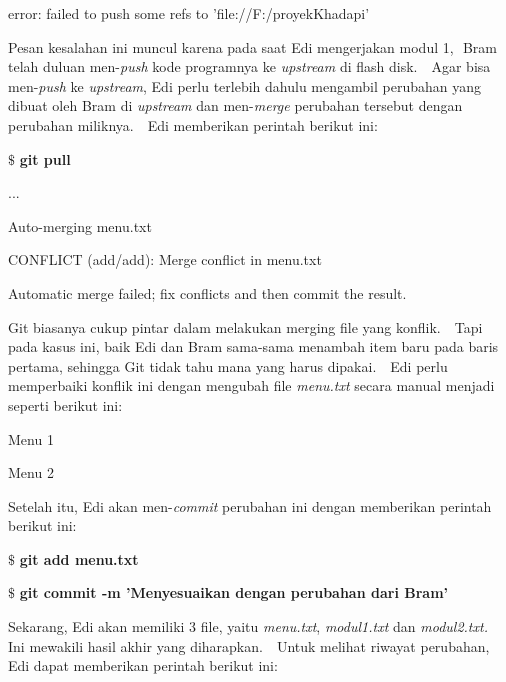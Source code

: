 \noindent 
error: failed to push some refs to 'file://F:/proyekKhadapi' \par
\noindent 
\vspace{12pt}
\noindent 
Pesan kesalahan ini muncul karena pada saat Edi mengerjakan modul 1, $  $ Bram telah duluan men-\textit{push} kode programnya ke \textit{upstream }di flash disk. $  $ $  $ Agar bisa men-\textit{push} ke \textit{upstream}, Edi perlu terlebih dahulu mengambil perubahan yang dibuat oleh Bram di \textit{upstream} dan men-\textit{merge} perubahan tersebut dengan perubahan miliknya. $  $ $  $ Edi memberikan perintah berikut ini: \par
\vspace{12pt}
\noindent 
 $  \$  $ \textbf{git pull} \par
\noindent 
... \par
\noindent 
Auto-merging menu.txt \par
\noindent 
CONFLICT (add/add): Merge conflict in menu.txt \par
\noindent 
Automatic merge failed; fix conflicts and then commit the result. \par
\noindent 
\vspace{12pt}
\noindent 
\vspace{12pt}
\noindent 
Git biasanya cukup pintar dalam melakukan merging file yang konflik. $  $ $  $ Tapi pada kasus ini, baik Edi dan Bram sama-sama menambah item baru pada baris pertama, sehingga Git tidak tahu mana yang harus dipakai. $  $ $  $ Edi perlu memperbaiki konflik ini dengan mengubah file \textit{menu.txt} secara manual menjadi seperti berikut ini: \par
\vspace{12pt}
\vspace{12pt}
\noindent 
Menu 1 \par
\noindent 
Menu 2 \par
\noindent 
\vspace{12pt}
\noindent 
\vspace{12pt}
\noindent 
Setelah itu, Edi akan men-\textit{commit} perubahan ini dengan memberikan perintah berikut ini: \par
\vspace{12pt}
\noindent 
 $  \$  $ \textbf{git add menu.txt} \par
\noindent 
 $  \$  $ \textbf{git commit -m 'Menyesuaikan dengan perubahan dari Bram'} \par
\noindent 
\vspace{12pt}
\noindent 
Sekarang, Edi akan memiliki 3 file, yaitu \textit{menu.txt}, \textit{modul1.txt} dan \textit{modul2.txt.} $  $ $  $ Ini mewakili hasil akhir yang diharapkan. $  $ $  $ Untuk melihat riwayat perubahan, Edi dapat memberikan perintah berikut ini: \par
